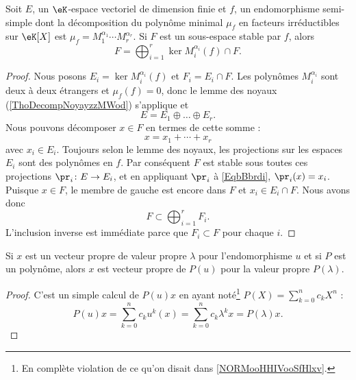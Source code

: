 \begin{corollary}   \label{CorKiSCkC}
	Soit \( E\), un \( \eK\)-espace vectoriel de dimension finie et \( f\), un endomorphisme semi-simple dont la décomposition du polynôme minimal \( \mu_f\) en facteurs irréductibles sur \( \eK[X]\) est \( \mu_f=M_1^{\alpha_1}\cdots M_r^{\alpha_r}\). Si \( F\) est un sous-espace stable par \( f\), alors
	\begin{equation}
		F=\bigoplus_{i=1}^r\ker M_i^{\alpha_i}(f)\cap F.
	\end{equation}
\end{corollary}

\begin{proof}
	Nous posons \( E_i=\ker M_i^{\alpha_i}(f)\) et \( F_i=E_i\cap F\). Les polynômes \( M_i^{\alpha_i}\) sont deux à deux étrangers et \( \mu_f(f)=0\), donc le lemme des noyaux (\ref{ThoDecompNoyayzzMWod}) s'applique et
	\begin{equation}
		E=E_1\oplus\ldots\oplus E_r.
	\end{equation}
	Nous pouvons décomposer \( x\in F\) en termes de cette somme :
	\begin{equation}     \label{EqbBbrdi}
		x=x_1+\cdots +x_r
	\end{equation}
	avec \( x_i\in E_i\). Toujours selon le lemme des noyaux, les projections sur les espaces \( E_i\) sont des polynômes en \( f\). Par conséquent \( F\) est stable sous toutes ces projections \( \pr_i\colon E\to E_i\), et en appliquant \( \pr_i\) à \eqref{EqbBbrdi}, \( \pr_i(x)=x_i\). Puisque \( x\in F\), le membre de gauche est encore dans \( F\) et \( x_i\in E_i\cap F\). Nous avons donc
	\begin{equation}
		F\subset\bigoplus_{i=1}^rF_i.
	\end{equation}
	L'inclusion inverse est immédiate parce que \( F_i\subset F\) pour chaque \( i\).
\end{proof}

\begin{lemma}   \label{LemVISooHxMdbr}
	Si \( x\) est un vecteur propre de valeur propre \( \lambda\) pour l'endomorphisme \( u\) et si \( P\) est un polynôme, alors \( x\) est vecteur propre de \( P(u)\) pour la valeur propre \( P(\lambda)\).
\end{lemma}

\begin{proof}
	C'est un simple calcul de \( P(u)x\) en ayant noté\footnote{En complète violation de ce qu'on disait dans \ref{NORMooHHIVooSfHlxv}.} \( P(X)=\sum_{k=0}^nc_kX^n\) :
	\begin{equation}
		P(u)x=\sum_{k=0}^nc_ku^k(x)=\sum_{k=0}^nc_k\lambda^kx=P(\lambda)x.
	\end{equation}
\end{proof}

